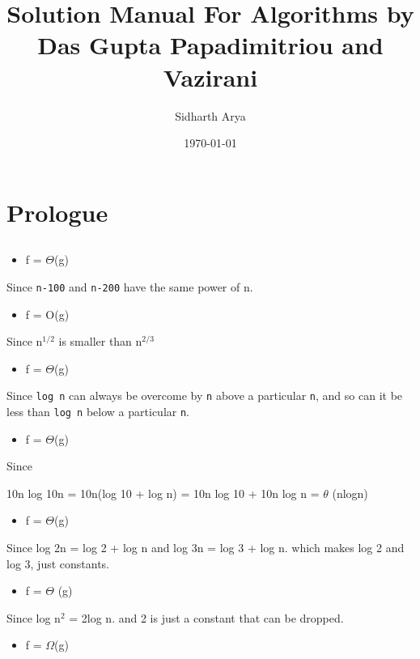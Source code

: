 \documentclass{book}
\author{Sidharth Arya}
\date{\today}
\title{Solution Manual For Algorithms by Das Gupta Papadimitriou and Vazirani}
\begin{document}
\maketitle
\frontmatter
\setcounter{tocdepth}{0}
\tableofcontents
\chapter{Prologue}
\label{sec:org40fc1ea}
\section{}
\label{sec:orgd153eaa}
\begin{itemize}
\item f = \(\Theta\)(g)
\end{itemize}

Since \texttt{n-100} and \texttt{n-200} have the same power of n.
\begin{itemize}
\item f = O(g)
\end{itemize}

Since n\(^{\text{1/2}}\) is smaller than n\(^{\text{2/3}}\)
\begin{itemize}
\item f = \(\Theta\)(g)
\end{itemize}

Since \texttt{log n} can always be overcome by \texttt{n} above a particular \texttt{n},  and so can it be less than \texttt{log n} below a particular \texttt{n}. 
\begin{itemize}
\item f = \(\Theta\)(g)
\end{itemize}

Since 
\begin{EQUATION}
10n log 10n 
= 10n(log 10 + log n)
= 10n log 10 + 10n log n
= \(\theta\) (nlogn)
\end{EQUATION}
\begin{itemize}
\item f = \(\Theta\)(g)
\end{itemize}

Since log 2n = log 2 + log n and log 3n = log 3 + log n. which makes log 2 and log 3, just constants.
\begin{itemize}
\item f = \(\Theta\) (g)
\end{itemize}

Since log n\(^{\text{2}}\) = 2log n. and 2 is just a constant that can be dropped.
\begin{itemize}
\item f = \(\Omega\)(g)
\end{itemize}
\end{document}
